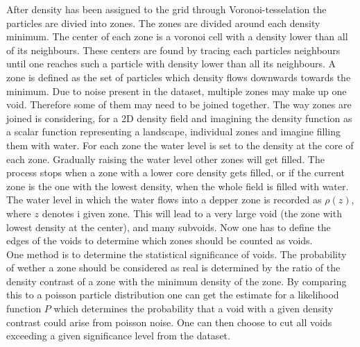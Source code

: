 After density has been assigned to
the grid through Voronoi-tesselation the particles are divied into zones. The
zones are divided around each density minimum. The center of each zone is a
voronoi cell with a density lower than all of its neighbours. These centers are
found by tracing each particles neighbours until one reaches such a particle with
density lower than all its neighbours. A zone is defined as the set of particles
which density flows downwards towards the minimum. Due to noise present in the
dataset, multiple zones may make up one void. Therefore some of them may need to
be joined together. The way zones are joined is considering, for a 2D density
field and imagining the density function as a scalar function representing a
landscape, individual zones and imagine filling them with water. For each zone
the water level is set to the density at the core of each zone. Gradually
raising the water level other zones will get filled. The process stops when a
zone with a lower core density gets filled, or if the current zone is the one
with the lowest density, when the whole field is filled with water. The water
level in which the water flows into a depper zone is recorded as $\rho(z)$, where $z$ denotes i given zone. This will lead to
a very large void (the zone with lowest density at the center), and many
subvoids. Now one has to define the edges of the voids to determine which zones
should be counted as voids.
\\\indent
One method is to determine the statistical significance of voids. The
probability of wether a zone should be considered as real is determined by the
ratio of the density contrast of a zone with the minimum density of the zone. By
comparing this to a poisson particle distribution one can get the estimate for a
likelihood function $P$ which determines the probability that a void with a
given density contrast could arise from poisson noise. One can then choose to
cut all voids exceeding a given significance level from the dataset.
